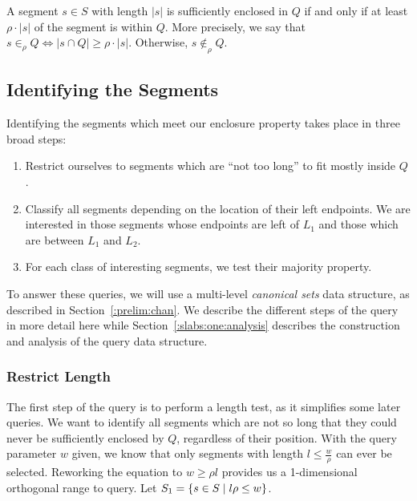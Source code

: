 A segment $s \in S$ with length $|s|$ is sufficiently enclosed in $Q$ if and only if at least $\rho \cdot |s|$ of the segment is within $Q$. More precisely, we say that $s \in_\rho Q \Leftrightarrow |s \cap Q| \geq \rho \cdot |s|$. Otherwise, $s \not \in_\rho Q$.


\subsection{Identifying the Segments}
\label{:slabs:one:approach}

Identifying the segments which meet our enclosure property takes place in three broad steps:

\begin{enumerate}
 \item Restrict ourselves to segments which are ``not too long'' to fit mostly inside $Q$.

 \item Classify all segments depending on the location of their left endpoints. We are interested in those segments whose endpoints are left of $L_1$ and those which are between $L_1$ and $L_2$.

 \item For each class of interesting segments, we test their majority property.

\end{enumerate}

To answer these queries, we will use a multi-level \emph{canonical sets} data structure, as described in Section~\ref{:prelim:chan}. We describe the different steps of the query in more detail here while Section~\ref{:slabs:one:analysis} describes the construction and analysis of the query data structure.


\subsubsection{Restrict Length}
\label{:slabs:one:details:restrict}

The first step of the query is to perform a length test, as it simplifies some later queries.  We want to identify all segments which are not so long that they could never be sufficiently enclosed by $Q$, regardless of their position. With the query parameter $w$ given, we know that only segments with length $l \leq \frac{w}{\rho}$ can ever be selected. Reworking the equation to $w \geq \rho l$ provides us a 1-dimensional orthogonal range to query. Let $S_1 = \{ s \in S \;|\; l \rho \leq w \}$.


